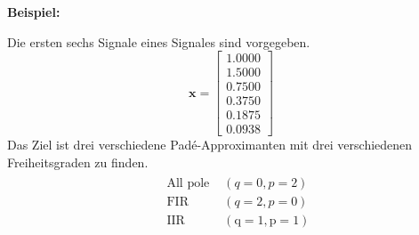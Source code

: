 \textbf{Beispiel:}

Die ersten sechs Signale eines Signales sind vorgegeben.
\begin{equation*}
\bm x=\left[
\begin{array}{l}
1.0000\\
1.5000\\
0.7500\\
0.3750\\
0.1875 \\
0.0938
\end{array}\right]
\end{equation*}
Das Ziel ist drei verschiedene Padé-Approximanten mit drei verschiedenen Freiheitsgraden zu finden.
\begin{equation*}\begin{aligned}
&\begin{array}{ll}
\text { All pole } & (q=0, p=2) \\
\text { FIR } & (q=2, p=0)\\
\text { IIR } &(\mathrm{q}=1, \mathrm{p}=1)
\end{array}\\
\end{aligned}\end{equation*}

